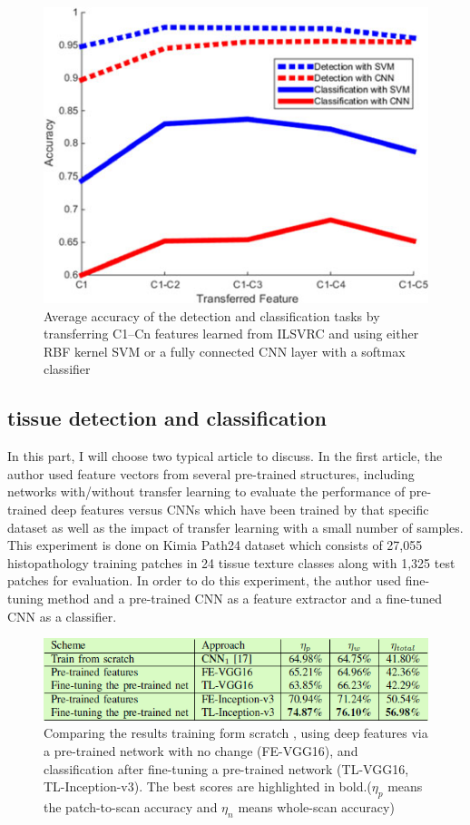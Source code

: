 \documentclass[10pt,twocolumn,letterpaper]{article}
\begin{document}
\begin{figure}[t]
	\begin{center}
		\includegraphics[width=0.8\linewidth]{8}
	\end{center}
	\caption{Average accuracy of the detection and classification tasks by transferring C1–Cn features learned from ILSVRC and using either RBF kernel SVM or a fully connected CNN layer with a softmax classifier} 
	\label{fig:long}
	\label{fig:onecol}
\end{figure}

\subsection{tissue detection and classification}

In this part, I will choose two typical article to discuss. In the first article\cite{kieffer2017convolutional}, the author used feature vectors from several pre-trained structures, including networks with/without transfer learning to evaluate the performance of pre-trained deep features versus CNNs which have been trained by that specific dataset as well as the impact of transfer learning with a small number of samples. This experiment is done on Kimia Path24 dataset which consists of 27,055 histopathology training patches in 24 tissue texture classes along with 1,325 test patches for evaluation. In order to do this experiment, the author used fine-tuning method and a pre-trained CNN as a feature extractor and a fine-tuned CNN as a classifier.

\begin{figure}[t]
	\begin{center}
		\includegraphics[width=0.8\linewidth]{12}
	\end{center}
	\caption{Comparing the results training form scratch , using deep features via a pre-trained network with no change (FE-VGG16), and classification after fine-tuning a pre-trained network (TL-VGG16, TL-Inception-v3). The best scores are highlighted in bold.(\textit{$\eta_p$} means the patch-to-scan accuracy and \textit{$\eta_n$} means whole-scan accuracy)} 
	\label{fig:long}
	\label{fig:onecol}
\end{figure}
\end{document}
